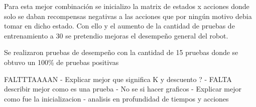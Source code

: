 Para esta mejor combinaci\'on se inicializo la matrix de estados x acciones donde solo se daban recompensas negativas a las acciones que por ning\'un motivo debia tomar en dicho estado. Con ello y el aumento de la cantidad de pruebas de entrenamiento a 30 se pretendio mejoras el desempeño general del robot. 

Se realizaron pruebas de desempeño con la cantidad de 15 pruebas donde se obtuvo un 100\% de pruebas positivas


FALTTTAAAAN
- Explicar mejor que significa K y descuento ?
- FALTA describir mejor como es una prueba
- No se si hacer graficos
- Explicar mejor como fue la inicializacion
- analisis en profundidad de tiempos y acciones

   


